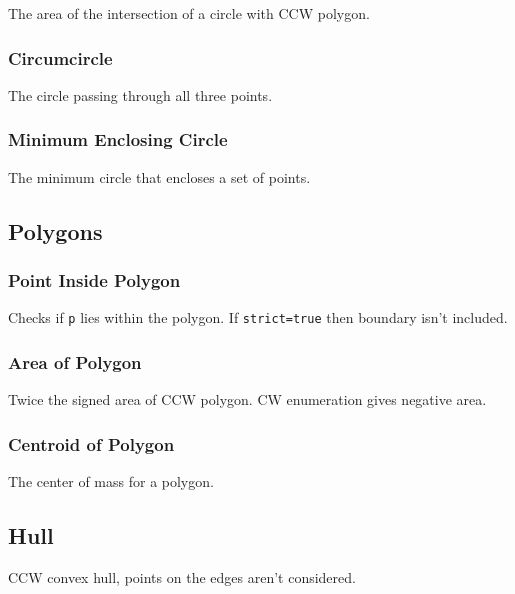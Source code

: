 The area of the intersection of a circle with CCW polygon.

\subsubsection{Circumcircle}

The circle passing through all three points.

\subsubsection{Minimum Enclosing Circle}

The minimum circle that encloses a set of points.

\subsection{Polygons}

\subsubsection{Point Inside Polygon}

Checks if \verb|p| lies within the polygon. If \verb|strict=true| then boundary isn't included.

\subsubsection{Area of Polygon}

Twice the signed area of CCW polygon. CW enumeration gives negative area.

\subsubsection{Centroid of Polygon}

The center of mass for a polygon.

\subsection{Hull}

CCW convex hull, points on the edges aren't considered.

